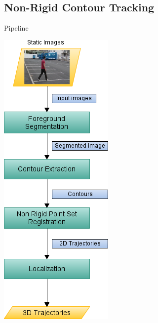 \graphicspath{
  {./images/bmps/}{./images/vects/}{./images/}
  {./images/presentation/bmps/}{./images/presentation/vects/}{./images/presentation/}
  {./images/chapter00/bmps/}{./images/chapter00/vects/}{./images/chapter00/}
  {./images/chapter02/bmps/}{./images/chapter02/vects/}{./images/chapter02/}
}

\subsection{Non-Rigid Contour Tracking}

\begin{frame}{Pipeline}
  \begin{center}
    \includegraphics{pipeline_cp02}
  \end{center}
  
\end{frame}

